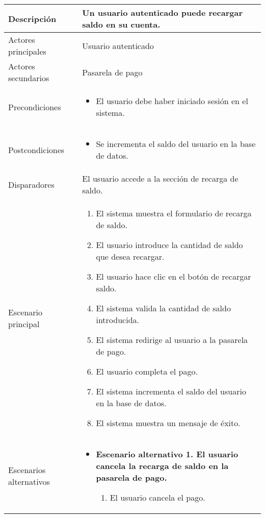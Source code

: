 \begin{longtable}{
    >{\columncolor{lightgreen!20}}p{4cm}
    p{12cm}
    }
    \midrule
    Descripción & Un usuario autenticado puede recargar saldo en su cuenta. \\
    \midrule
    Actores principales & Usuario autenticado \\
    \midrule
    Actores secundarios &  Pasarela de pago \\
    \midrule
    Precondiciones & \begin{itemize}[nosep,leftmargin=*]
        \item El usuario debe haber iniciado sesión en el sistema.
    \end{itemize} \\
    \midrule
    Postcondiciones & \begin{itemize}[nosep,leftmargin=*]
        \item Se incrementa el saldo del usuario en la base de datos.
    \end{itemize} \\
    \midrule
    Disparadores & El usuario accede a la sección de recarga de saldo. \\
    \midrule
    Escenario principal & \begin{enumerate}[nosep,leftmargin=*]
        \item El sistema muestra el formulario de recarga de saldo.
        \item El usuario introduce la cantidad de saldo que desea recargar.
        \item El usuario hace clic en el botón de recargar saldo.
        \item El sistema valida la cantidad de saldo introducida.
        \item El sistema redirige al usuario a la pasarela de pago.
        \item El usuario completa el pago.
        \item El sistema incrementa el saldo del usuario en la base de datos.
        \item El sistema muestra un mensaje de éxito.
    \end{enumerate} \\
    \midrule
    Escenarios alternativos & 
    \begin{itemize}[nosep,leftmargin=*]
        \item \textbf{Escenario alternativo 1. El usuario cancela la recarga de saldo en la pasarela de pago.}
        \begin{enumerate}[nosep,leftmargin=*]
            \item El usuario cancela el pago.

\end{enumerate}
\end{itemize}
\end{longtable}
